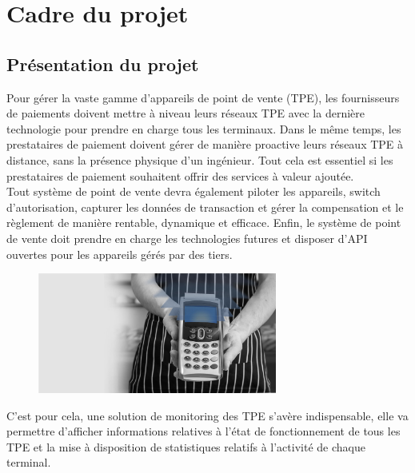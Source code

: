 \section{Cadre du projet}

\subsection{Présentation du projet}

Pour gérer la vaste gamme d'appareils de point de vente (TPE), les fournisseurs de paiements doivent mettre à niveau leurs réseaux TPE avec la dernière technologie pour prendre en charge tous les terminaux. Dans le même temps, les prestataires de paiement doivent gérer de manière proactive leurs réseaux TPE à distance, sans la présence physique d'un ingénieur. Tout cela est essentiel si les prestataires de paiement souhaitent offrir des services à valeur ajoutée.\\

Tout système de point de vente devra également piloter les appareils, switch d'autorisation, capturer les données de transaction et gérer la compensation et le règlement de manière rentable, dynamique et efficace. Enfin, le système de point de vente doit prendre en charge les technologies futures et disposer d'API ouvertes pour les appareils gérés par des tiers.\\

\begin{figure}[h!]  
  \centering
    \includegraphics[width=0.7\textwidth]{chapitre1/Figures/pmo.png}
\end{figure}


C'est pour cela, une solution de monitoring des TPE s’avère indispensable, elle va permettre d'afficher informations relatives à l’état de fonctionnement de tous les TPE et la mise à disposition de statistiques relatifs  à l’activité de chaque terminal.

